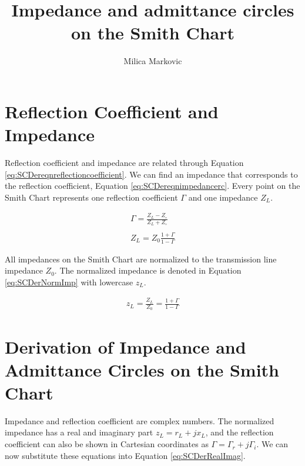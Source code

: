 \documentclass{ximera}
\title{Impedance and admittance circles on the Smith Chart}
\author{Milica Markovic}
\begin{document}
  
\begin{abstract}  

\end{abstract}  
\maketitle    





\section{Reflection Coefficient and Impedance}



Reflection coefficient and impedance are related through Equation \ref{eq:SCDereqnreflectioncoefficient}. We can find an impedance that corresponds to the reflection coefficient, Equation \ref{eq:SCDereqnimpedancerc}. Every point on the Smith Chart represents one reflection coefficient $\Gamma$ and one impedance $Z_L$. 



\begin{eqnarray}
\Gamma = \frac{Z_L-Z_\circ}{Z_L+Z_\circ} \label{eq:SCDereqnreflectioncoefficient} \\ \nonumber \\
Z_L = Z_0 \frac{ 1+ \Gamma}{1- \Gamma } \label{eq:SCDereqnimpedancerc}
\end{eqnarray}


All impedances on the Smith Chart are normalized to the transmission line impedance $Z_0$. The normalized impedance is denoted in Equation \ref{eq:SCDerNormImp} with lowercase $z_L$.

\begin{eqnarray}
z_L = \frac{Z_L}{Z_0} = \frac{ 1+ \Gamma}{1- \Gamma } \label{eq:SCDerNormImp}
\end{eqnarray}

\section{Derivation of Impedance and Admittance Circles on the Smith Chart}

Impedance and reflection coefficient are complex numbers. The normalized impedance has a real and imaginary part $z_L=r_L + j x_L$, and the reflection coefficient can also be shown in Cartesian coordinates as $\Gamma = \Gamma_r + j \Gamma_i $. We can now substitute these equations into Equation \ref{eq:SCDerRealImag}.
\end{document}
